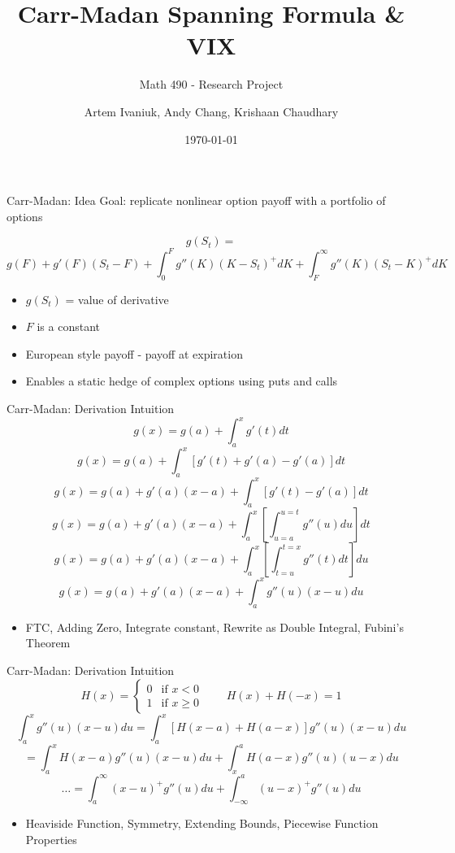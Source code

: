 \documentclass{beamer}
\title{Carr-Madan Spanning Formula \& VIX}
\subtitle{Math 490 - Research Project}
\author{Artem Ivaniuk, Andy Chang, Krishaan Chaudhary}
\date{\today}
\begin{document}
\frame{\titlepage}


\begin{frame}{Carr-Madan: Idea}
Goal: replicate nonlinear option payoff with a portfolio of options

\[
g(S_t)
=
\]
\[
g(F) + g'(F)(S_t - F)
+ \int_0^F g''(K)(K - S_t)^+ dK
+ \int_F^\infty g''(K)(S_t - K)^+ dK
\]

\begin{itemize}
\item $g(S_t)$ = value of derivative
\item $F$ is a constant
\item European style payoff - payoff at expiration
\item Enables a static hedge of complex options using puts and calls

\end{itemize}
\end{frame}


\begin{frame}{Carr-Madan: Derivation Intuition}
\[
g(x) = g(a) + \int_a^x g'(t) dt
\]
\[
g(x) = g(a) + \int_a^x [g'(t) + g'(a) - g'(a)] dt
\]
\[
g(x) = g(a) + g'(a)(x-a) +\int_a^x [g'(t)-g'(a)] dt 
\]
\[
g(x) = g(a) + g'(a)(x-a) + \int_a^x \left[ \int_{u=a}^{u=t}g''(u) du \right] dt
\]
\[
g(x) = g(a) + g'(a)(x-a) + \int_a^x \left[ \int_{t=u}^{t=x}g''(t) dt \right]du
\]
\[
g(x) = g(a) + g'(a)(x-a) + \int_a^x g''(u) (x-u) du
\]

\begin{itemize}
\item FTC, Adding Zero, Integrate constant, Rewrite as Double Integral, Fubini's Theorem

\end{itemize}
\end{frame}


\begin{frame}{Carr-Madan: Derivation Intuition}
\[
H(x) =
\begin{cases}
0 & \text{if } x < 0 \\
1 & \text{if } x \ge 0
\end{cases} \quad \quad H(x) + H(-x) = 1
\]
\[
\int_a^x g''(u) (x-u) du = \int_a^x [H(x-a) + H(a-x)]g''(u) (x-u) du
\]
\[
= \int_a^x H(x-a)g''(u) (x-u) du + \int_x^a H(a-x)g''(u) (u-x) du
\]
\[
\dots  = \int_a^\infty (x-u)^+ g''(u) du + \int_{-\infty}^a (u-x)^+g''(u)du
\]


\begin{itemize}
\item Heaviside Function, Symmetry, Extending Bounds, Piecewise Function Properties

\end{itemize}
\end{frame}
\end{document}
